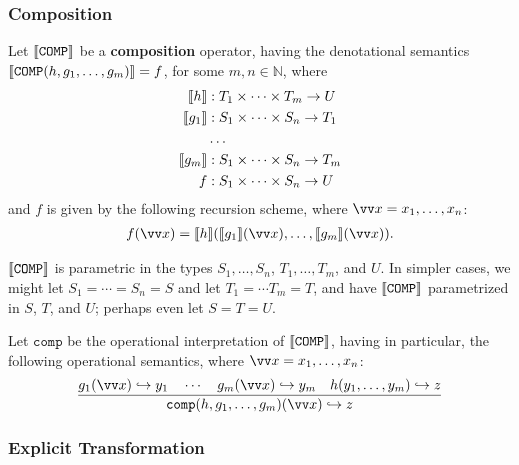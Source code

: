 \subsubsection{Composition}

\begin{definition} Let ${\mathopen{}\left\llbracket{\mathtt{COMP}}\right\rrbracket\mathclose{}}$ be a \textbf{composition}
operator, having the denotational semantics
${\mathopen{}\left\llbracket{\mathtt{COMP}{\ensuremath{\mathopen{}\left({h,g_1,\ldots,g_m}\right)\mathclose{}}}}\right\rrbracket\mathclose{}} = f$, for some $m,n\in \mathbb{N}$,
where \begin{align*}
%
\sem{h} & : T_1 \times \cdots \times T_m \rightarrow U \\
%
\sem{g_1} & : S_1 \times \cdots \times S_n \rightarrow T_1 \\
%
& \ldots \\
%
\sem{g_m} & : S_1 \times \cdots \times S_n \rightarrow T_m \\
%
f & : S_1 \times \cdots \times S_n \rightarrow U
%
\end{align*} and $f$ is given by the following recursion scheme, where
$\vect{x} = x_1,\ldots,x_n$:\begin{align*}
%
f\p{\vect{x}} = \sem{h}\p{\sem{g_1}\p{\vect{x}}, \ldots,
\sem{g_m}\p{\vect{x}}}.
%
\end{align*}

\end{definition}

\begin{remark} ${\mathopen{}\left\llbracket{\mathtt{COMP}}\right\rrbracket\mathclose{}}$ is parametric in the types
$S_1,\ldots,S_n$, $T_1,\ldots,T_m$, and $U$. In simpler cases, we might let
$S_1 = \cdots = S_n = S$ and let $T_1 = \cdots T_m = T$, and have
${\mathopen{}\left\llbracket{\mathtt{COMP}}\right\rrbracket\mathclose{}}$ parametrized in $S$, $T$, and $U$; perhaps even let
$S=T=U$. \end{remark}

\begin{definition} \label{def:operational-comp} Let $\mathtt{comp}$ be the
operational interpretation of ${\mathopen{}\left\llbracket{\mathtt{COMP}}\right\rrbracket\mathclose{}}$, having in particular, the
following operational semantics, where $\vect{x} = x_1, \ldots,
x_n$:\begin{align*}
%
\judgement{
%
  g_1\p{\vect{x}} \goesto y_1 \quad \cdots \quad g_m\p{\vect{x}} \goesto y_m
\quad h\p{y_1,\ldots, y_m} \goesto z
%
}{
%
  \mathtt{comp}\p{h,g_1,\ldots,g_m}\p{\vect{x}} \goesto z
%
}
%
\end{align*}

\end{definition}

\subsubsection{Explicit Transformation}

